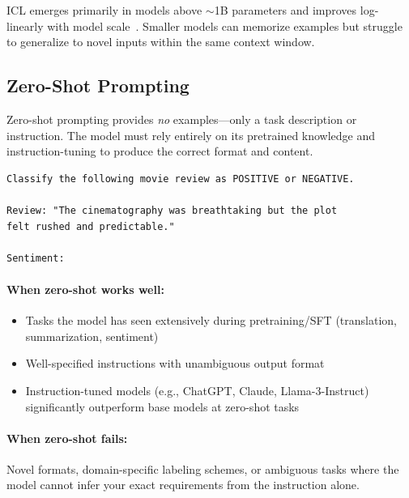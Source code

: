 ICL emerges primarily in models above $\sim$1B parameters and improves log-linearly with model scale~\cite{brown2020language}. Smaller models can memorize examples but struggle to generalize to novel inputs within the same context window.

\subsection{Zero-Shot Prompting}
\label{zero-shot-prompting}

Zero-shot prompting provides \emph{no} examples---only a task description or instruction. The model must rely entirely on its pretrained knowledge and instruction-tuning to produce the correct format and content.

\begin{examplebox}
\begin{lstlisting}
Classify the following movie review as POSITIVE or NEGATIVE.

Review: "The cinematography was breathtaking but the plot 
felt rushed and predictable."

Sentiment:
\end{lstlisting}
\end{examplebox}

\paragraph{When zero-shot works well:}
\label{when-zero-shot-works-well}

\begin{itemize}
  \item Tasks the model has seen extensively during pretraining/SFT (translation, summarization, sentiment)
  \item Well-specified instructions with unambiguous output format
  \item Instruction-tuned models (e.g., ChatGPT, Claude, Llama-3-Instruct) significantly outperform base models at zero-shot tasks~\cite{ouyang2022training}
\end{itemize}

\paragraph{When zero-shot fails:}
\label{when-zero-shot-fails}

Novel formats, domain-specific labeling schemes, or ambiguous tasks where the model cannot infer your exact requirements from the instruction alone.


